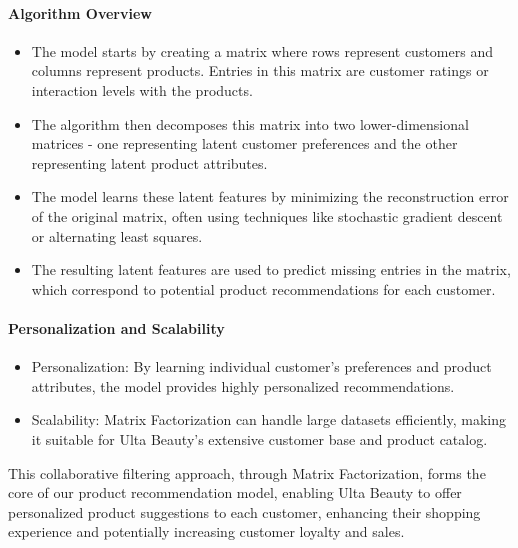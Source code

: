 \documentclass{article}
\begin{document}
\paragraph{Algorithm Overview}
\begin{itemize}
    \item The model starts by creating a matrix where rows represent customers and columns represent products. Entries in this matrix are customer ratings or interaction levels with the products.
    \item The algorithm then decomposes this matrix into two lower-dimensional matrices - one representing latent customer preferences and the other representing latent product attributes.
    \item The model learns these latent features by minimizing the reconstruction error of the original matrix, often using techniques like stochastic gradient descent or alternating least squares.
    \item The resulting latent features are used to predict missing entries in the matrix, which correspond to potential product recommendations for each customer.
\end{itemize}

\paragraph{Personalization and Scalability}
\begin{itemize}
    \item Personalization: By learning individual customer's preferences and product attributes, the model provides highly personalized recommendations.
    \item Scalability: Matrix Factorization can handle large datasets efficiently, making it suitable for Ulta Beauty's extensive customer base and product catalog.
\end{itemize}

This collaborative filtering approach, through Matrix Factorization, forms the core of our product recommendation model, enabling Ulta Beauty to offer personalized product suggestions to each customer, enhancing their shopping experience and potentially increasing customer loyalty and sales.
\end{document}
